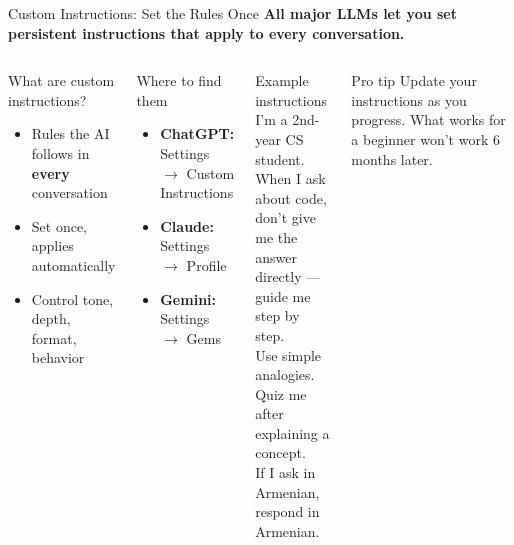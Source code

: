 \documentclass[aspectratio=169]{beamer}
\begin{document}
\begin{frame}{Custom Instructions: Set the Rules Once}
\small
\textbf{\color{popblue}All major LLMs let you set persistent instructions that apply to every conversation.}

\smallskip
\begin{columns}[T]
\begin{block}{What are custom instructions?}
\begin{itemize}\setlength\itemsep{0em}
  \item Rules the AI follows in \textbf{every} conversation
  \item Set once, applies automatically
  \item Control tone, depth, format, behavior
\end{itemize}
\end{block}

\smallskip
\begin{exampleblock}{Where to find them}
\begin{itemize}\setlength\itemsep{0em}
  \item \textbf{ChatGPT:} Settings $\to$ Custom Instructions
  \item \textbf{Claude:} Settings $\to$ Profile
  \item \textbf{Gemini:} Settings $\to$ Gems
\end{itemize}
\end{exampleblock}

\begin{block}{Example instructions}
\ttfamily\scriptsize
I'm a 2nd-year CS student.\\[2pt]
When I ask about code, don't give\\
me the answer directly --- guide me\\
step by step.\\[2pt]
Use simple analogies.\\[2pt]
Quiz me after explaining a concept.\\[2pt]
If I ask in Armenian, respond in\\
Armenian.
\end{block}

\smallskip
\begin{alertblock}{Pro tip}
Update your instructions as you progress. What works for a beginner won't work 6 months later.
\end{alertblock}
\end{columns}
\end{frame}
\end{document}
